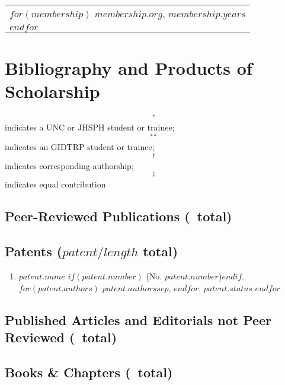 \documentclass[martgin, line]{article}
\begin{document}
\begin{tabular}{l}
$for(membership)$
$membership.org$, $membership.years$\\
$endfor$
\end{tabular}


\section*{Bibliography and Products of Scholarship}

\begin{footnotesize}$$^*$$ indicates a UNC or JHSPH student or trainee;
    $$^{**}$$ indicates an GIDTRP student or trainee;
    $$^\dagger$$ indicates corresponding authorship;
    $$^\ddagger$$ indicates equal contribution
  \end{footnotesize}

\subsection*{Peer-Reviewed Publications (\npeer\ total)} 

\begin{enumerate}
  
\end{enumerate}


\subsection*{Patents ($patent/length$ total)}
\begin{enumerate}
  $for(patent)$
  \item
  $patent.name$
  $if(patent.number)$ (No. $patent.number$)$endif$.
  $for(patent.authors)$
  $patent.authors$$sep$,
  $endfor$.
  \textit{$patent.status$}
  $endfor$
\end{enumerate}


\subsection*{Published Articles and Editorials not Peer Reviewed (\nnopeer\ total)}

\begin{enumerate}
  
\end{enumerate}


\subsection*{Books \& Chapters (\nchapters\ total)}
\end{document}

